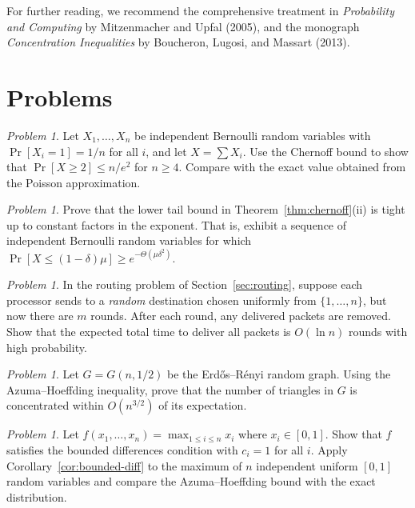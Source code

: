 \documentclass[twoside,12pt]{book}
\theoremstyle{plain}
\theoremstyle{definition}
\theoremstyle{remark}
\newtheorem{problem}[theorem]{Problem}
\begin{document}
For further reading, we recommend the comprehensive treatment in
\emph{Probability and Computing} by Mitzenmacher and Upfal (2005), and
the monograph \emph{Concentration Inequalities} by Boucheron, Lugosi, and
Massart (2013).

\section*{Problems}

\begin{problem}
Let $X_1, \ldots, X_n$ be independent Bernoulli random variables with
$\Pr[X_i = 1] = 1/n$ for all $i$, and let $X = \sum X_i$. Use the
Chernoff bound to show that $\Pr[X \geq 2] \leq n/e^2$ for $n \geq 4$.
Compare with the exact value obtained from the Poisson approximation.
\end{problem}

\begin{problem}
Prove that the lower tail bound in Theorem~\ref{thm:chernoff}(ii) is
tight up to constant factors in the exponent. That is, exhibit a sequence
of independent Bernoulli random variables for which $\Pr[X \leq
(1-\delta)\mu] \geq e^{-\Theta(\mu\delta^2)}$.
\end{problem}

\begin{problem}
In the routing problem of Section~\ref{sec:routing}, suppose each
processor sends to a \emph{random} destination chosen uniformly from
$\{1, \ldots, n\}$, but now there are $m$ rounds. After each round, any
delivered packets are removed. Show that the expected total time to deliver
all packets is $O(\ln n)$ rounds with high probability.
\end{problem}

\begin{problem}
Let $G = G(n, 1/2)$ be the Erd\H{o}s--R\'{e}nyi random graph. Using the
Azuma--Hoeffding inequality, prove that the number of triangles in $G$ is
concentrated within $O(n^{3/2})$ of its expectation.
\end{problem}

\begin{problem}
Let $f(x_1, \ldots, x_n) = \max_{1 \leq i \leq n} x_i$ where $x_i \in
[0, 1]$. Show that $f$ satisfies the bounded differences condition with
$c_i = 1$ for all $i$. Apply Corollary~\ref{cor:bounded-diff} to the
maximum of $n$ independent uniform $[0,1]$ random variables and compare
the Azuma--Hoeffding bound with the exact distribution.
\end{problem}
\end{document}
